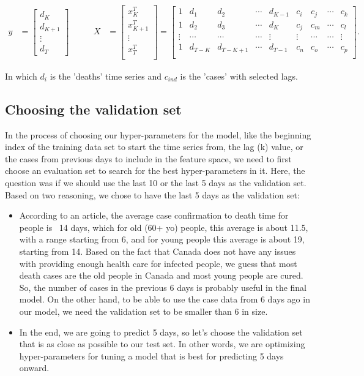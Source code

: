 \documentclass{article}
\begin{document}
\begin{align*}
y &= \begin{bmatrix}
d_K \\ d_{K+1}\\ \vdots\\ d_T
\end{bmatrix} &\qquad
X &= 
\begin{bmatrix}
x_K^T \\
x_{K+1}^T \\
\vdots \\
x_{T}^T \\
\end{bmatrix}
 =
\begin{bmatrix}
1 & d_1 & d_2 & \cdots & d_{K-1} & c_i & c_j & \cdots & c_k\\
1 & d_2 & d_3 &  \cdots & d_{K} & c_j & c_m & \cdots & c_l\\
\vdots & \cdots &\cdots &\cdots &\vdots &\vdots &\cdots &\cdots &\vdots\\
1 & d_{T-K} & d_{T-K+1} &  \cdots & d_{T-1} & c_n & c_o & \cdots & c_p\\
\end{bmatrix}.	
\end{align*}

In which $d_i$ is the 'deaths' time series and $c_{ind}$ is the 'cases' with selected lags.

\subsection{Choosing the validation set}

In the process of choosing our hyper-parameters for the model, like the beginning index of the training data set to start the time series from, the lag (k) value, or the cases from previous days to include in the feature space, we need to first choose an evaluation set to search for the best hyper-parameters in it. Here, the question was if we should use the last 10 or the last 5 days as the validation set. Based on two reasoning, we chose to have the last 5 days as the validation set:

\begin{itemize}
\item According to an article, the average case confirmation to death time for people is ~14 days, which for old (60+ yo) people, this average is about 11.5, with a range starting from 6, and for young people this average is about 19, starting from 14. Based on the fact that Canada does not have any issues with providing enough health care for infected people, we guess that most death cases are the old people in Canada and most young people are cured. So, the number of cases in the previous 6 days is probably useful in the final model. On the other hand, to be able to use the case data from 6 days ago in our model, we need the validation set to be smaller than 6 in size.

\item In the end, we are going to predict 5 days, so let’s choose the validation set that is as close as possible to our test set. In other words, we are optimizing hyper-parameters for tuning a model that is best for predicting 5 days onward.
\end{itemize}
\end{document}
